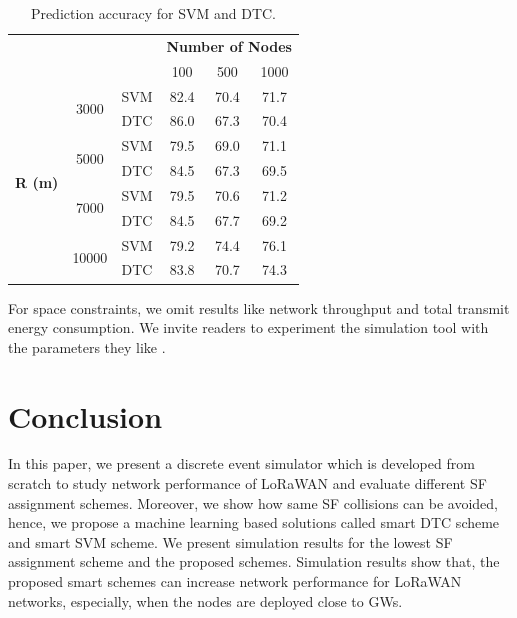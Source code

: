 \documentclass[conference]{IEEEtran}
\begin{document}
\begin{table}
\centering
\caption{Prediction accuracy for SVM and DTC.}
\label{table:prediction_accuracy}
\begin{tabular}{|c|c|c|c|c|c|}
\hline
\multicolumn{3}{|c|}{\multirow{2}{*}{}}                        & \multicolumn{3}{c|}{\textbf{Number of Nodes}} \\ \cline{4-6}
\multicolumn{3}{|c|}{}                                         & 100           & 500           & 1000          \\ \hline
\multirow{8}{*}{\textbf{R (m)}} & \multirow{2}{*}{3000}  & SVM & 82.4          & 70.4          & 71.7          \\ \cline{3-6}
                                &                        & DTC & 86.0          & 67.3          & 70.4          \\ \cline{2-6}

                                & \multirow{2}{*}{5000}  & SVM & 79.5          & 69.0          & 71.1          \\ \cline{3-6}
                                &                        & DTC & 84.5          & 67.3          & 69.5          \\ \cline{2-6}

                                & \multirow{2}{*}{7000}  & SVM & 79.5          & 70.6          & 71.2          \\ \cline{3-6}
                                &                        & DTC & 84.5          & 67.7          & 69.2          \\ \cline{2-6}

                                & \multirow{2}{*}{10000} & SVM & 79.2          & 74.4          & 76.1          \\ \cline{3-6}
                                &                        & DTC & 83.8          & 70.7          & 74.3          \\ \hline
\end{tabular}
\end{table}

\par For space constraints, we omit results like network throughput and total transmit energy consumption. We invite readers to experiment the simulation tool with the parameters they like \cite{simlorasf}.


\section{Conclusion} \label{Conclusion}
\par In this paper, we present a discrete event simulator which is developed from scratch to study network performance of LoRaWAN and evaluate different SF assignment schemes. Moreover, we show how same SF collisions can be avoided, hence, we propose a machine learning based solutions called smart DTC scheme and smart SVM scheme. We present simulation results for the lowest SF assignment scheme and the proposed schemes. Simulation results show that, the proposed smart schemes can increase network performance for LoRaWAN networks, especially, when the nodes are deployed close to GWs.
\end{document}

